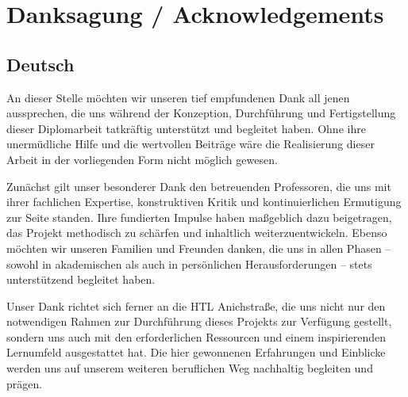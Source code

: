 \chapter{Danksagung / Acknowledgements}
\label{cha:acknowledgements}

\section*{Deutsch}

An dieser Stelle möchten wir unseren tief empfundenen Dank all jenen aussprechen, die uns während der Konzeption, Durchführung und Fertigstellung dieser Diplomarbeit tatkräftig unterstützt und begleitet haben. Ohne ihre unermüdliche Hilfe und die wertvollen Beiträge wäre die Realisierung dieser Arbeit in der vorliegenden Form nicht möglich gewesen.

Zunächst gilt unser besonderer Dank den betreuenden Professoren, die uns mit ihrer fachlichen Expertise, konstruktiven Kritik und kontinuierlichen Ermutigung zur Seite standen. Ihre fundierten Impulse haben maßgeblich dazu beigetragen, das Projekt methodisch zu schärfen und inhaltlich weiterzuentwickeln. Ebenso möchten wir unseren Familien und Freunden danken, die uns in allen Phasen – sowohl in akademischen als auch in persönlichen Herausforderungen – stets unterstützend begleitet haben.

Unser Dank richtet sich ferner an die HTL Anichstraße, die uns nicht nur den notwendigen Rahmen zur Durchführung dieses Projekts zur Verfügung gestellt, sondern uns auch mit den erforderlichen Ressourcen und einem inspirierenden Lernumfeld ausgestattet hat. Die hier gewonnenen Erfahrungen und Einblicke werden uns auf unserem weiteren beruflichen Weg nachhaltig begleiten und prägen.

